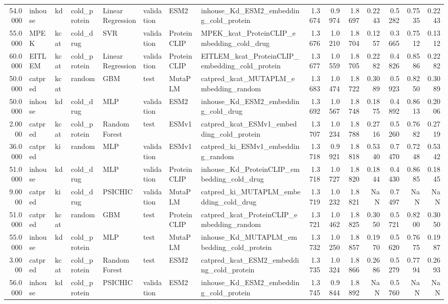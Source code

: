 \begin{tabular}{rlllllllrrrrrrr}
54.0000 & inhouse & kd & cold_protein & Linear Regression & validation & ESM2 & inhouse_Kd_ESM2_embedding_cold_protein & 1.3674 & 0.9974 & 1.8697 & 0.2243 & 0.5282 & 0.7535 & 0.2243 \\
55.0000 & MPEK & kcat & cold_drug & SVR & validation & ProteinCLIP & MPEK_kcat_ProteinCLIP_embedding_cold_drug & 1.3676 & 1.0210 & 1.8704 & 0.1257 & 0.3665 & 0.7512 & 0.1312 \\
60.0000 & EITLEM & kcat & cold_protein & Linear Regression & validation & ProteinCLIP & EITLEM_kcat_ProteinCLIP_embedding_cold_protein & 1.3677 & 1.0559 & 1.8705 & 0.2282 & 0.4826 & 0.8586 & 0.2282 \\
50.0000 & catpred & kcat & random & GBM & test & MutaPLM & catpred_kcat_MUTAPLM_embedding_random & 1.3683 & 1.0474 & 1.8722 & 0.3089 & 0.5923 & 0.8250 & 0.3089 \\
50.0000 & inhouse & kd & cold_drug & MLP & validation & ESM2 & inhouse_Kd_ESM2_embedding_cold_drug & 1.3692 & 1.0567 & 1.8748 & 0.1875 & 0.4892 & 0.8613 & 0.2006 \\
2.0000 & catpred & kcat & cold_protein & Random Forest & test & ESMv1 & catpred_kcat_ESMv1_embedding_cold_protein & 1.3707 & 1.0234 & 1.8788 & 0.2716 & 0.5260 & 0.7682 & 0.2719 \\
36.0000 & catpred & ki & random & MLP & validation & ESMv1 & catpred_ki_ESMv1_embedding_random & 1.3718 & 0.9921 & 1.8818 & 0.5340 & 0.7470 & 0.7248 & 0.5342 \\
51.0000 & inhouse & kd & cold_drug & MLP & validation & ProteinCLIP & inhouse_Kd_ProteinCLIP_embedding_cold_drug & 1.3718 & 1.0727 & 1.8820 & 0.1844 & 0.4430 & 0.8685 & 0.1845 \\
9.0000 & catpred & ki & cold_drug & PSICHIC & validation & MutaPLM & catpred_ki_MUTAPLM_embedding_cold_drug & 1.3719 & 1.0232 & 1.8821 & NaN & 0.7497 & NaN & NaN \\
51.0000 & catpred & kcat & random & GBM & test & ProteinCLIP & catpred_kcat_ProteinCLIP_embedding_random & 1.3721 & 1.0462 & 1.8825 & 0.3050 & 0.5721 & 0.8200 & 0.3050 \\
55.0000 & inhouse & kd & cold_protein & MLP & test & MutaPLM & inhouse_Kd_MUTAPLM_embedding_cold_protein & 1.3732 & 1.0250 & 1.8857 & 0.1970 & 0.5620 & 0.7675 & 0.1987 \\
3.0000 & catpred & kcat & cold_protein & Random Forest & test & ESM2 & catpred_kcat_ESM2_embedding_cold_protein & 1.3735 & 1.0324 & 1.8866 & 0.2686 & 0.5279 & 0.7794 & 0.2693 \\
56.0000 & inhouse & kd & cold_protein & PSICHIC & validation & ESM2 & inhouse_Kd_ESM2_embedding_cold_protein & 1.3745 & 0.9844 & 1.8892 & NaN & 0.5760 & NaN & NaN \\

\end{tabular}
